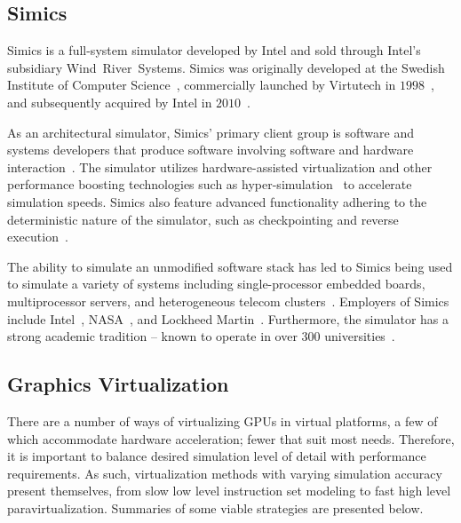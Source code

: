 \subsection{Simics}
\label{sec:simics}
Simics is a full-system simulator developed by Intel and sold through Intel's subsidiary Wind~River~Systems.
Simics was originally developed at the Swedish Institute of Computer Science~, commercially launched by Virtutech in $1998$~, and subsequently acquired by Intel in $2010$~.

As an architectural simulator, Simics' primary client group is software and systems developers that produce software involving software and hardware interaction~.
The simulator utilizes hardware-assisted virtualization and other performance boosting technologies such as hyper-simulation~ to accelerate simulation speeds.
Simics also feature advanced functionality adhering to the deterministic nature of the simulator, such as checkpointing and reverse execution~.

The ability to simulate an unmodified software stack has led to Simics being used to simulate a variety of systems including single-processor embedded boards, multiprocessor servers, and heterogeneous telecom clusters~.
Employers of Simics include Intel~, NASA~, and Lockheed Martin~.
Furthermore, the simulator has a strong academic tradition -- known to operate in over $300$ universities~.

\subsection{Graphics Virtualization}
\label{sec:previousresearch_graphicsvirtualization}
There are a number of ways of virtualizing GPUs in virtual platforms, a few of which accommodate hardware acceleration; fewer that suit most needs.
Therefore, it is important to balance desired simulation level of detail with performance requirements.
As such, virtualization methods with varying simulation accuracy present themselves, from slow low level instruction set modeling to fast high level paravirtualization.
Summaries of some viable strategies are presented below.

